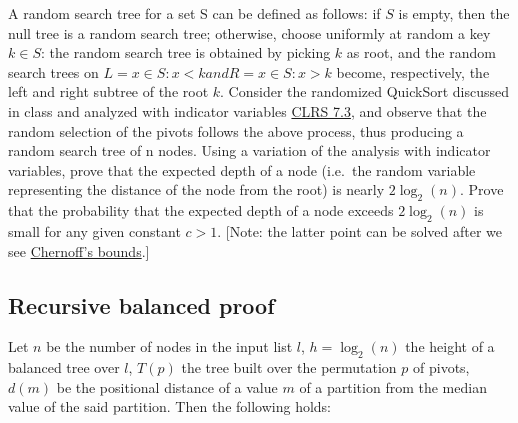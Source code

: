 \documentclass{article}
\begin{document}
A random search tree for a set S can be defined as follows: if $S$ is empty, then
the null tree is a random search tree; otherwise, choose uniformly at random a key
$k \in S$: the random search tree is obtained by picking
$k$ as root, and the random search trees on $L = {x \in S : x < k} and R = {x \in S :
x > k}$ become, respectively, the left and right subtree of the root $k$.
Consider the randomized QuickSort discussed in class and analyzed with indicator
variables \href{http://didawiki.cli.di.unipi.it/lib/exe/fetch.php/magistraleinformatica/alg2/algo2_13/randqs.pdf}{CLRS 7.3},
and observe that the random selection of the pivots follows the above process,
thus producing a random search tree of n nodes. Using a variation of the analysis
with indicator variables, prove that the expected depth of a node (i.e.\ the random variable
representing the distance of the node from the root) is nearly $2\log_2 (n)$.
Prove that the probability that the expected depth of a node exceeds $2\log_2 (n)$ is small for
any given constant $c > 1$. [Note: the latter point can be solved after we see
\href{https://en.wikipedia.org/wiki/Chernoff_bound}{Chernoff’s bounds}.]

\subsection{Recursive balanced proof}

Let $n$ be the number of nodes in the input list $l$, $h = \log_2(n)$ the height
of a balanced tree over $l$, $T(p)$ the tree built over the permutation $p$ of pivots,
$d(m)$ be the positional distance of a value $m$ of a partition from the median
value of the said partition.
Then the following holds:
\end{document}
